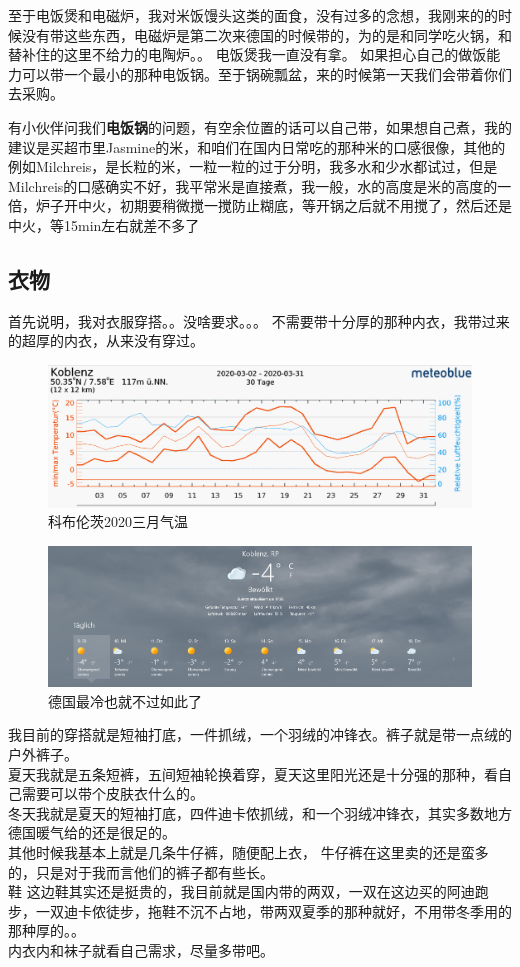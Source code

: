 \documentclass[doku.tex]{subfiles}
\begin{document}
至于电饭煲和电磁炉，我对米饭馒头这类的面食，没有过多的念想，我刚来的的时候没有带这些东西，电磁炉是第二次来德国的时候带的，为的是和同学吃火锅，和替补住的这里不给力的电陶炉。。 电饭煲我一直没有拿。 如果担心自己的做饭能力可以带一个最小的那种电饭锅。至于锅碗瓢盆，来的时候第一天我们会带着你们去采购。

有小伙伴问我们\textbf{电饭锅\label{Reis}}的问题，有空余位置的话可以自己带，如果想自己煮，我的建议是买超市里Jasmine的米，和咱们在国内日常吃的那种米的口感很像，其他的例如Milchreis，是长粒的米，一粒一粒的过于分明，我多水和少水都试过，但是Milchreis的口感确实不好，我平常米是直接煮，我一般，水的高度是米的高度的一倍，炉子开中火，初期要稍微搅一搅防止糊底，等开锅之后就不用搅了，然后还是中火，等15min左右就差不多了~
	\subsection{衣物}
首先说明，我对衣服穿搭。。没啥要求。。。 不需要带十分厚的那种内衣，我带过来的超厚的内衣，从来没有穿过。
\begin{figure}
	\centering
	\includegraphics[width=0.7\linewidth]{screenshot001}
	\caption{科布伦茨2020三月气温}
	\label{fig:screenshot001}
\end{figure}
\begin{figure}
	\centering
	\includegraphics[width=0.7\linewidth]{screenshot002}
	\caption{德国最冷也就不过如此了}
	\label{fig:screenshot002}
\end{figure}
我目前的穿搭就是短袖打底，一件抓绒，一个羽绒的冲锋衣。裤子就是带一点绒的户外裤子。\\
夏天我就是五条短裤，五间短袖轮换着穿，夏天这里阳光还是十分强的那种，看自己需要可以带个皮肤衣什么的。\\
冬天我就是夏天的短袖打底，四件迪卡侬抓绒，和一个羽绒冲锋衣，其实多数地方德国暖气给的还是很足的。\\
其他时候我基本上就是几条牛仔裤，随便配上衣，
牛仔裤在这里卖的还是蛮多的，只是对于我而言他们的裤子都有些长。\\
鞋 这边鞋其实还是挺贵的，我目前就是国内带的两双，一双在这边买的阿迪跑步，一双迪卡侬徒步，拖鞋不沉不占地，带两双夏季的那种就好，不用带冬季用的那种厚的。。\\
内衣内和袜子就看自己需求，尽量多带吧。
\end{document}
